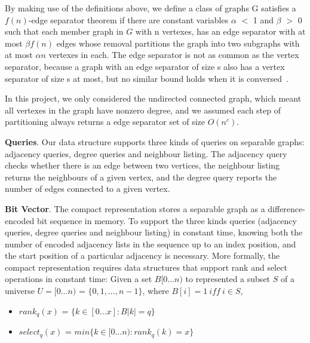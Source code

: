 \documentclass[12pt,glossary]{dalthesis}
\begin{document}
By making use of the definitions above, we define a class of graphs G satisfies a $f(n)$-edge separator theorem if there are constant variables $\alpha$ $<$ 1 and $\beta$ $>$ 0 such that each member graph in $G$ with n vertexes, has an edge separator with at most $\beta f(n)$ edges whose removal partitions the graph into two subgraphs with at most $\alpha n$ vertexes in each. The edge separator is not as common as the vertex separator, because a graph with an edge separator of size s also has a vertex separator of size s at most, but no similar bound holds when it is conversed~\cite{compact-representation}.

\bigskip
\bigskip

In this project, we only considered the undirected connected graph, which meant all vertexes in the graph have nonzero degree, and we assumed each step of partitioning always returns a edge separator set of size $O(n^{c})$.

\bigskip
\bigskip

\textbf{Queries}. Our data structure supports three kinds of queries on separable graphs: adjacency queries, degree queries and neighbour listing. The adjacency query checks whether there is an edge between two vertices, the neighbour listing returns the neighbours of a given vertex, and the degree query reports the number of edges connected to a given vertex.

\bigskip
\bigskip

\textbf{Bit Vector}. The compact representation stores a separable graph as a difference-encoded bit sequence in memory. To support the three kinds queries (adjacency queries, degree queries and neighbour listing) in constant time, knowing both the number of encoded adjacency lists in the sequence up to an index position, and the start position of a particular adjacency is necessary. More formally, the compact representation requires data structures that support rank and select operations in constant time: Given a set $B[0...n)$ to represented a subset $S$ of a universe $U = [0...n)$ = $\{0,1,...,n-1 \}$, where $B[i] = 1 \ iff \ i \in S$,

\begin{itemize}[noitemsep]
\item $rank_{q}(x)$ = $\{k \in [0...x] : B|k| = q \}$
\item $select_{q}(x)$ = $ min \{ k \in [0...n) : rank_{q}(k) = x \} $ 
\end{itemize}

\bigskip
\end{document}
